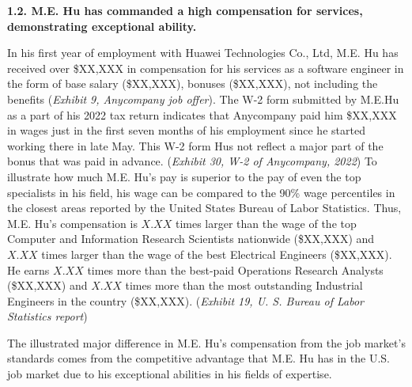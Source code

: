 \documentclass{article}
\begin{document}
{\bf 1.2. M.E. Hu has commanded a high compensation for services, demonstrating exceptional ability. }

In his first year of employment with Huawei Technologies Co., Ltd, M.E. Hu has received over \$XX,XXX in compensation for his services as a software engineer in the form of base salary (\$XX,XXX), bonuses (\$XX,XXX), not including the benefits ({\it Exhibit 9, Anycompany job offer}). The W-2 form submitted by M.E.Hu as a part of his 2022 tax return indicates that Anycompany paid him \$XX,XXX in wages just in the first seven months of his employment since he started working there in late May. This W-2 form Hus not reflect a major part of the bonus that was paid in advance. ({\it Exhibit 30, W-2 of Anycompany, 2022}) To illustrate how much M.E. Hu's pay is superior to the pay of even the top specialists in his field, his wage can be compared to the 90\% wage percentiles in the closest areas reported by the United States Bureau of Labor Statistics. Thus, M.E. Hu's compensation is $X.XX$ times larger than the wage of the top Computer and Information Research Scientists nationwide (\$XX,XXX) and $X.XX$ times larger than the wage of the best Electrical Engineers (\$XX,XXX). He earns $X.XX$ times more than the best-paid Operations Research Analysts (\$XX,XXX) and $X.XX$ times more than the most outstanding Industrial Engineers in the country (\$XX,XXX). ({\it Exhibit 19, U. S. Bureau of Labor Statistics report}) 
 

The illustrated major difference in M.E. Hu's compensation from the job market's standards comes from the competitive advantage that M.E. Hu has in the U.S. job market due to his exceptional abilities in his fields of expertise. 
\end{document}
